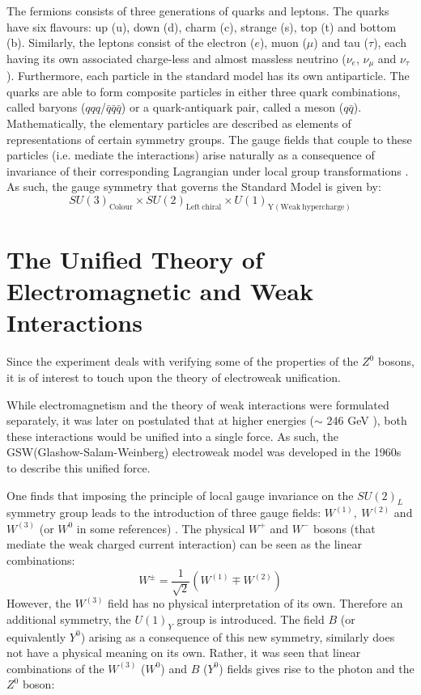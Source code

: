 The fermions consists of three generations of quarks and leptons. The quarks have six flavours: up (u), down (d), charm (c), strange (s), top (t) and bottom (b). Similarly, the leptons consist of the electron ($e$), muon ($\mu$) and tau ($\tau$), each having its own associated charge-less and almost massless neutrino ($\nu_{e}$, $\nu_{\mu}$ and $\nu_{\tau}$). Furthermore, each particle in the standard model has its own antiparticle. The quarks are able to form composite particles in either three quark combinations, called baryons ($qqq$/$\bar{q}\bar{q}\bar{q}$) or a quark-antiquark pair, called a meson ($q\bar{q}$). Mathematically, the elementary particles are described as elements of representations of certain symmetry groups. The gauge fields that couple to these particles (i.e. mediate the interactions) arise naturally as a consequence of invariance of their corresponding Lagrangian under local group transformations \cite{thomson_2013}. As such, the gauge symmetry that governs the Standard Model is given by: $$SU(3)_{\mathrm{Colour}}\times SU(2)_{\mathrm{Left\ chiral}}\times U(1)_{\mathrm{Y}(\mathrm{Weak \ hypercharge})}$$

\section{The Unified Theory of Electromagnetic and Weak Interactions}
Since the experiment deals with verifying some of the properties of the $Z^{0}$ bosons, it is of interest to touch upon the theory of electroweak unification.

While electromagnetism and the theory of weak interactions were formulated separately, it was later on postulated that at higher energies ($\sim$ 246 GeV \cite{pdg-ew}), both these interactions would be unified into a single force. As such, the GSW(Glashow-Salam-Weinberg) electroweak model was developed in the 1960s to describe this unified force. 

One finds that imposing the principle of local gauge invariance on the $SU(2)_{L}$ symmetry group leads to the introduction of three gauge fields: $W^{(1)},\ W^{(2)}$ and $W^{(3)}$ (or $W^{0}$ in some references) \cite{thomson_2013}. The physical $W^{+}$ and $W^{-}$ bosons (that mediate the weak charged current interaction) can be seen as the linear combinations: 
\begin{equation}
W^{\pm}=\dfrac{1}{\sqrt{2}}\left(W^{(1)}\mp W^{(2)}\right)
\end{equation}
However, the $W^{(3)}$ field has no physical interpretation of its own. Therefore an additional symmetry, the $U(1)_{Y}$ group is introduced. The field $B$ (or equivalently $Y^{0}$) arising as a consequence of this new symmetry, similarly does not have a physical meaning on its own. Rather, it was seen that linear combinations of the $W^{(3)}$ ($W^{0}$) and $B$ ($Y^{0}$) fields gives rise to the  photon and the $Z^{0}$ boson:

